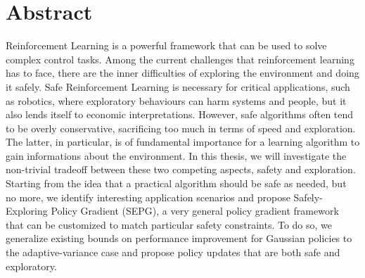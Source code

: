 \chapter*{Abstract}


Reinforcement Learning is a powerful framework that can be used to solve complex control tasks. Among the current challenges that reinforcement learning has to face, there are the inner difficulties of exploring the environment and doing it safely.
Safe Reinforcement Learning is necessary for critical applications, such as robotics, where exploratory behaviours can harm systems and people, but it also lends itself to economic interpretations. However, safe algorithms often tend to be overly conservative, sacrificing too much in terms of speed and exploration. The latter, in particular, is of fundamental importance for a learning algorithm to gain informations about the environment. In this thesis, we will investigate the non-trivial tradeoff between these two competing aspects, safety and exploration. 
Starting from the idea that a practical algorithm should be safe as needed, but no more, we identify interesting application scenarios and propose Safely-Exploring Policy Gradient (SEPG), a very general policy gradient framework that can be customized to match particular safety constraints. To do so, we generalize existing bounds on performance improvement for Gaussian policies to the adaptive-variance case and propose policy updates that are both safe and exploratory. 
